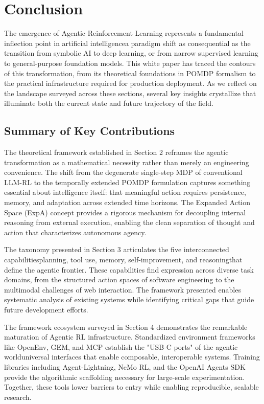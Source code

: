 \section{ Conclusion}

The emergence of Agentic Reinforcement Learning represents a fundamental inflection point in artificial intelligencea paradigm shift as consequential as the transition from symbolic AI to deep learning, or from narrow supervised learning to general-purpose foundation models. This white paper has traced the contours of this transformation, from its theoretical foundations in POMDP formalism to the practical infrastructure required for production deployment. As we reflect on the landscape surveyed across these sections, several key insights crystallize that illuminate both the current state and future trajectory of the field.

\subsection{Summary of Key Contributions}

The theoretical framework established in Section 2 reframes the agentic transformation as a mathematical necessity rather than merely an engineering convenience. The shift from the degenerate single-step MDP of conventional LLM-RL to the temporally extended POMDP formulation captures something essential about intelligence itself: that meaningful action requires persistence, memory, and adaptation across extended time horizons. The Expanded Action Space (ExpA) concept provides a rigorous mechanism for decoupling internal reasoning from external execution, enabling the clean separation of thought and action that characterizes autonomous agency.

The taxonomy presented in Section 3 articulates the five interconnected capabilitiesplanning, tool use, memory, self-improvement, and reasoningthat define the agentic frontier. These capabilities find expression across diverse task domains, from the structured action spaces of software engineering to the multimodal challenges of web interaction. The framework presented enables systematic analysis of existing systems while identifying critical gaps that guide future development efforts.

The framework ecosystem surveyed in Section 4 demonstrates the remarkable maturation of Agentic RL infrastructure. Standardized environment frameworks like OpenEnv, GEM, and MCP establish the "USB-C ports" of the agentic worlduniversal interfaces that enable composable, interoperable systems. Training libraries including Agent-Lightning, NeMo RL, and the OpenAI Agents SDK provide the algorithmic scaffolding necessary for large-scale experimentation. Together, these tools lower barriers to entry while enabling reproducible, scalable research.

